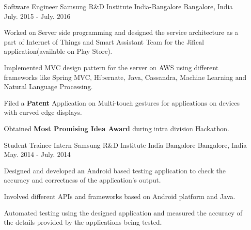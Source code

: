 \begin{cventries}
  \cventry
    {Software Engineer}
    {Samsung R\&D Institute India-Bangalore}
    {Bangalore, India}
    {July. 2015 - July. 2016}
    {
      \begin{cvitems}
        \item {Worked on Server side programming and designed the service architecture as a part of Internet of Things and Smart Assistant Team for the Jifical application(available on Play Store).}
        \item {Implemented MVC design pattern for the server on AWS using different frameworks like Spring MVC, Hibernate, Java, Cassandra, Machine Learning and Natural Language Processing.}
        \item{Filed a \textbf{Patent} Application on Multi-touch gestures for applications on devices with curved edge displays.}
        \item{Obtained \textbf{Most Promising Idea Award} during intra division Hackathon.}
      \end{cvitems}
    }
  \cventry
    {Student Trainee Intern}
    {Samsung R\&D Institute India-Bangalore}
    {Bangalore, India}
    {May. 2014 - July. 2014}
    {
      \begin{cvitems}
        \item {Designed and developed an Android based testing application to check the accuracy and correctness of the application's output.}
        \item {Involved different APIs and frameworks based on Android platform and Java.}
        \item{Automated testing using the designed application and measured the accuracy of the details provided by the applications being tested.}
      \end{cvitems}
    }

    
\end{cventries}

